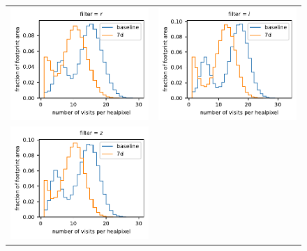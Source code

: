 \documentclass[preprintm,linenumbers]{aastex631}
\begin{document}
\begin{figure}
\begin{tabular}{@{}c@{}c@{}}
				 \includegraphics{results/histograms/hist_first_year_one_snap_v4_0_10yrs_db_noDD_noTwi_CountMetric_doAllTemplateMetrics_reduceCount_r_7_noDD_noTwi.pdf} &
				\includegraphics{results/histograms/hist_first_year_one_snap_v4_0_10yrs_db_noDD_noTwi_CountMetric_doAllTemplateMetrics_reduceCount_i_7_noDD_noTwi.pdf} \\
				 \includegraphics{results/histograms/hist_first_year_one_snap_v4_0_10yrs_db_noDD_noTwi_CountMetric_doAllTemplateMetrics_reduceCount_z_7_noDD_noTwi.pdf} &

\end{tabular}
\end{figure}
\end{document}
